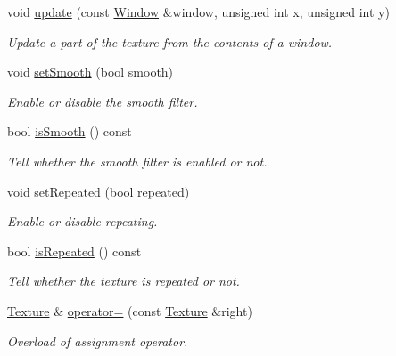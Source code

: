 \begin{DoxyCompactItemize}
void \hyperlink{classsf_1_1Texture_a154f246eb8059b602076009ab1cfd175}{update} (const \hyperlink{classsf_1_1Window}{Window} \&window, unsigned int x, unsigned int y)
\begin{DoxyCompactList}\small\item\em Update a part of the texture from the contents of a window. \end{DoxyCompactList}\item 
void \hyperlink{classsf_1_1Texture_a0c3bd6825b9a99714f10d44179d74324}{set\-Smooth} (bool smooth)
\begin{DoxyCompactList}\small\item\em Enable or disable the smooth filter. \end{DoxyCompactList}\item 
bool \hyperlink{classsf_1_1Texture_a1d6643d3c76f2be29dc401dc22749e16}{is\-Smooth} () const 
\begin{DoxyCompactList}\small\item\em Tell whether the smooth filter is enabled or not. \end{DoxyCompactList}\item 
void \hyperlink{classsf_1_1Texture_aaa87d1eff053b9d4d34a24c784a28658}{set\-Repeated} (bool repeated)
\begin{DoxyCompactList}\small\item\em Enable or disable repeating. \end{DoxyCompactList}\item 
bool \hyperlink{classsf_1_1Texture_a007a19b48952b7854120bf423c102150}{is\-Repeated} () const 
\begin{DoxyCompactList}\small\item\em Tell whether the texture is repeated or not. \end{DoxyCompactList}\item 
\hyperlink{classsf_1_1Texture}{Texture} \& \hyperlink{classsf_1_1Texture_a80a089b6b19bb09b83012d5f0e6af9ba}{operator=} (const \hyperlink{classsf_1_1Texture}{Texture} \&right)
\begin{DoxyCompactList}\small\item\em Overload of assignment operator. \end{DoxyCompactList}\end{DoxyCompactItemize}
